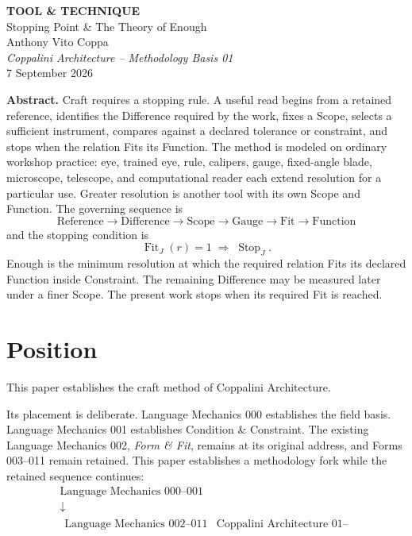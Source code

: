 \documentclass[10pt]{article}
\newcommand{\fit}{\operatorname{Fit}}
\newcommand{\stopop}{\operatorname{Stop}}
\begin{document}
\begin{center}
{\Large\bfseries TOOL \& TECHNIQUE}\\[2pt]
{\large Stopping Point \& The Theory of Enough}\\[6pt]
{\normalsize Anthony Vito Coppa}\\[2pt]
{\itshape Coppalini Architecture -- Methodology Basis 01}\\[2pt]
7 September 2026
\end{center}

\begin{framed}
\small
\textbf{Abstract.} Craft requires a stopping rule. A useful read begins from a retained reference, identifies the Difference required by the work, fixes a Scope, selects a sufficient instrument, compares against a declared tolerance or constraint, and stops when the relation Fits its Function. The method is modeled on ordinary workshop practice: eye, trained eye, rule, calipers, gauge, fixed-angle blade, microscope, telescope, and computational reader each extend resolution for a particular use. Greater resolution is another tool with its own Scope and Function. The governing sequence is
\[
\boxed{\mathrm{Reference}\to\mathrm{Difference}\to\mathrm{Scope}\to\mathrm{Gauge}\to\mathrm{Fit}\to\mathrm{Function}}
\]
and the stopping condition is
\[
\boxed{\fit_J(r)=1\;\Longrightarrow\;\stopop_J.}
\]
Enough is the minimum resolution at which the required relation Fits its declared Function inside Constraint. The remaining Difference may be measured later under a finer Scope. The present work stops when its required Fit is reached.
\end{framed}

\section{Position}

This paper establishes the craft method of Coppalini Architecture.

Its placement is deliberate. Language Mechanics 000 establishes the field basis. Language Mechanics 001 establishes Condition \& Constraint. The existing Language Mechanics 002, \emph{Form \& Fit}, remains at its original address, and Forms 003--011 remain retained. This paper establishes a methodology fork while the retained sequence continues:
\[
\boxed{
\begin{array}{c}
\text{Language Mechanics 000--001}\\
\downarrow\\[-2pt]
\begin{array}{cc}
\text{Language Mechanics 002--011} & \text{Coppalini Architecture 01--}
\end{array}
\end{array}}
\]
\end{document}
